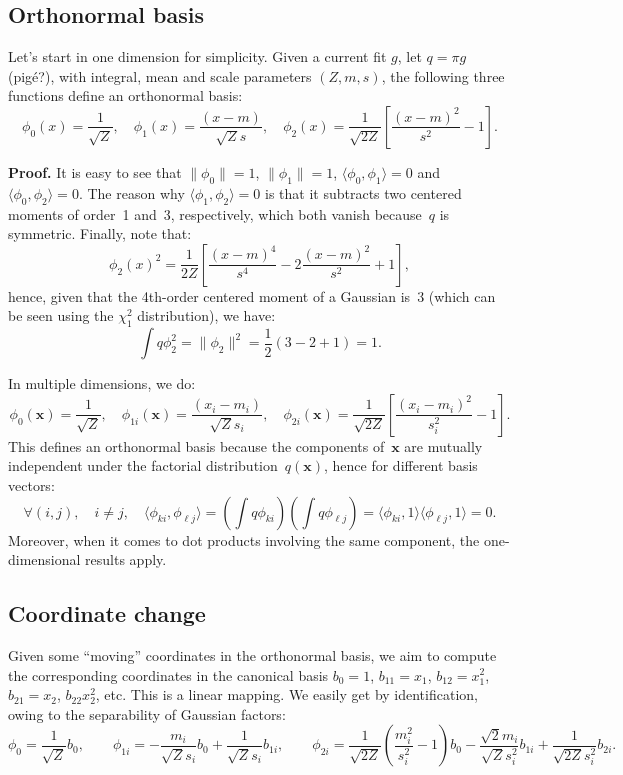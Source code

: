 \documentclass{article}
\def\x{\mathbf{x}}
\begin{document}
\subsection{Orthonormal basis}

Let's start in one dimension for simplicity. Given a current fit $g$, let $q=\pi g$ (pig\'e?),  with integral, mean and scale parameters $(Z, m, s)$, the following three functions define an orthonormal basis:
$$
\phi_0(x) = \frac{1}{\sqrt{Z}},
\quad \phi_1(x) = \frac{(x-m)}{\sqrt{Z}s},
\quad \phi_2(x) = \frac{1}{\sqrt{2Z}}\left[\frac{(x-m)^2}{s^2} - 1\right].
$$

{\bf Proof.} It is easy to see that $\|\phi_0\|=1$, $\|\phi_1\|=1$, $\langle \phi_0, \phi_1 \rangle=0$ and $\langle \phi_0, \phi_2 \rangle=0$. The reason why $\langle \phi_1, \phi_2 \rangle=0$ is that it subtracts two centered moments of order~1 and~3, respectively, which both vanish because~$q$ is symmetric. Finally, note that:
$$
\phi_2(x)^2 = \frac{1}{2Z} 
\left[\frac{(x-m)^4}{s^4} - 2 \frac{(x-m)^2}{s^2} + 1 \right],
$$
hence, given that the 4th-order centered moment of a Gaussian is~3 (which can be seen using the $\chi_1^2$ distribution), we have:
$$
\int q \phi_2^2 = \|\phi_2\|^2 = \frac{1}{2} (3 - 2 + 1) = 1.
$$

In multiple dimensions, we do:
$$
\phi_0(\x) = \frac{1}{\sqrt{Z}}, 
\quad
\phi_{1i}(\x) = \frac{(x_i-m_i)}{\sqrt{Z} s_i},
\quad
\phi_{2i}(\x) = \frac{1}{\sqrt{2Z}}\left[\frac{(x_i-m_i)^2}{s_i^2} - 1\right].
$$
This defines an orthonormal basis because the components of~$\x$ are mutually independent under the factorial distribution~$q(\x)$, hence for different basis vectors: 
$$
\forall (i,j), \quad i\not= j, \quad
\langle \phi_{ki}, \phi_{\ell j} \rangle
= \left(\int q \phi_{ki}\right)\left(\int q \phi_{\ell j}\right)
= \langle \phi_{ki}, 1 \rangle \langle \phi_{\ell j}, 1 \rangle = 0.
$$
Moreover, when it comes to dot products involving the same component, the one-dimensional results apply.


\subsection{Coordinate change}

Given some ``moving'' coordinates in the orthonormal basis, we aim to compute the corresponding coordinates in the canonical basis $b_0=1$, $b_{11}=x_1$, $b_{12}=x_1^2$, $b_{21}=x_2$, $b_{22}x_2^2$, etc. This is a linear mapping. We easily get by identification, owing to the separability of Gaussian factors:
$$
\phi_0 =
\frac{1}{\sqrt{Z}} b_0,
\qquad
\phi_{1i} =
-\frac{m_i}{\sqrt{Z}s_i} b_0
+ \frac{1}{\sqrt{Z}s_i} b_{1i},
\qquad
\phi_{2i} =
\frac{1}{\sqrt{2Z}} \left(\frac{m_i^2}{s_i^2} - 1\right) b_0
- \frac{\sqrt{2}m_i}{\sqrt{Z}s_i^2} b_{1i}
+ \frac{1}{\sqrt{2Z}s_i^2} b_{2i}.
$$
\end{document}

